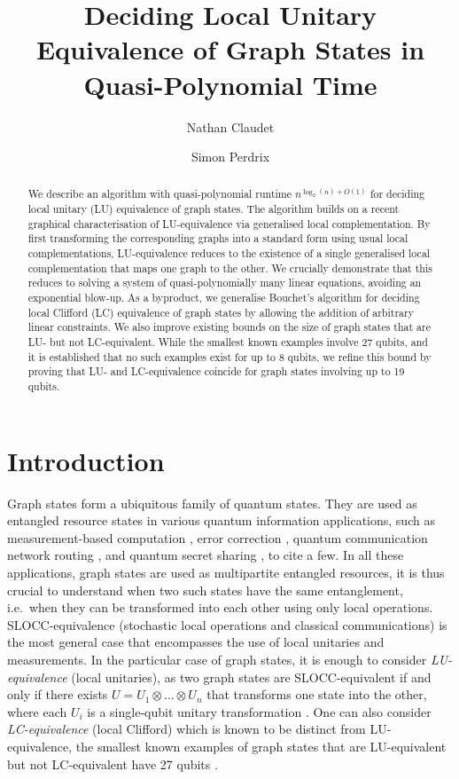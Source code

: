 \documentclass[a4paper,UKenglish,cleveref,autoref,thm-restate]{arxiv}
\title{Deciding  Local Unitary Equivalence of Graph States in Quasi-Polynomial Time}
\author{Nathan Claudet}{Inria Mocqua and Université de Lorraine, CNRS, LORIA, F-54000 Nancy, France
}{nathan.claudet@inria.fr}{https://orcid.org/0009-0000-0862-1264}{}
\author{Simon Perdrix}{Inria Mocqua and Université de Lorraine, CNRS, LORIA, F-54000 Nancy, France}{simon.perdrix@loria.fr}{https://orcid.org/0000-0002-1808-2409}{}
\begin{document}
\maketitle

\begin{abstract}  

    We describe an algorithm with quasi-polynomial runtime $n^{\log_2(n)+O(1)}$ for deciding local unitary (LU) equivalence of graph states. The algorithm builds on a recent graphical characterisation of LU-equivalence via generalised local complementation. By first transforming the corresponding graphs into a standard form using usual local complementations, LU-equivalence reduces to the existence of  a single generalised local complementation that maps one graph to the other. We crucially demonstrate that this reduces to solving a system of quasi-polynomially many linear equations, avoiding an exponential blow-up. As a byproduct, we generalise Bouchet's algorithm for deciding local Clifford (LC) equivalence of graph states by allowing the addition of arbitrary linear constraints. We also improve existing bounds on the size of graph states that are LU- but not LC-equivalent. While the smallest known examples involve 27 qubits, and it is established that no such examples exist for up to 8 qubits, we refine this bound by proving that LU- and LC-equivalence coincide for graph states involving up to 19 qubits.
\end{abstract}

\section{Introduction}

Graph states form a ubiquitous family of quantum states. They are used as entangled resource states in various quantum information applications, such as measurement-based computation \cite{raussendorf2001one, raussendorf2003measurement, briegel2009measurement}, error correction \cite{schlingemann2001quantum,schlingemann2001stabilizer,cross2008codeword,sarvepalli2011local}, quantum communication network routing \cite{hahn2019quantum,meignant2019distributing, bravyi2024generating, Cautres2024}, and quantum secret sharing \cite{markham2008graph,gravier2013quantum},  to cite a few.  
In all these applications, graph states are used as multipartite entangled resources, it is thus crucial to understand when two such states have the same entanglement, i.e.~when they can be transformed into each other using only local operations. SLOCC-equivalence (stochastic local operations and classical communications) is the most general case that encompasses the use of local unitaries and measurements. In the particular case of graph states, it is enough to consider \emph{LU-equivalence} (local unitaries), as two graph states are SLOCC-equivalent if and only if there exists $U=U_1\otimes \ldots \otimes U_n$ that transforms one state into the other, where each $U_i$ is a single-qubit unitary transformation \cite{Hein04}. One can also consider \emph{LC-equivalence} (local Clifford) which is known to be distinct from LU-equivalence, the smallest known examples of graph states that are LU-equivalent but not LC-equivalent have 27 qubits \cite{Ji07,Tsimakuridze17}. 
\end{document}
